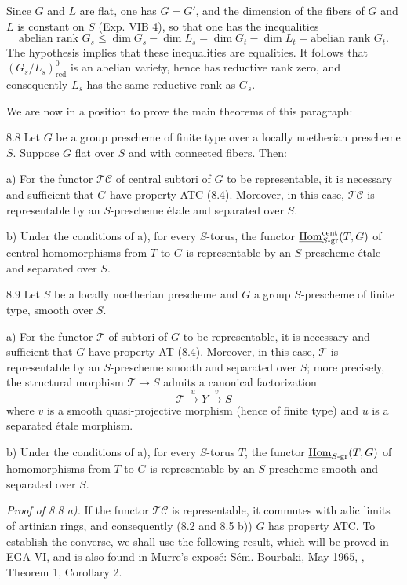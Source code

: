 Since $G$ and $L$ are flat, one has $G=G'$, and the dimension of the fibers of $G$ and $L$ is constant on $S$ (Exp. VIB 4), so that one has the inequalities
\[
\text{abelian rank }G_s\leq\dim G_s-\dim L_s=\dim G_t-\dim L_t=\text{abelian rank }G_t.
\]
The hypothesis implies that these inequalities are equalities. It follows that $(G_s/L_s)^0_{\mathrm{red}}$ is an abelian variety, hence has reductive rank zero, and consequently $L_s$ has the same reductive rank as $G_s$.

We are now in a position to prove the main theorems of this paragraph:
\begin{theorem}{8.8}\label{XV.8.8}
Let $G$ be a group prescheme of finite type over a locally noetherian prescheme $S$. Suppose $G$ flat over $S$ and with connected fibers. Then:

\noindent a) For the functor $\mathscr{TC}$ of central subtori of $G$ to be representable, it is necessary and sufficient that $G$ have property ATC (8.4). Moreover, in this case, $\mathscr{TC}$ is representable by an $S$-prescheme étale and separated over $S$.

\noindent b) Under the conditions of a), for every $S$-torus, the functor $\underline{\operatorname{Hom}}^{\mathrm{cent}}_{S\text{-gr}}(T,G)$ of central homomorphisms from $T$ to $G$ is representable by an $S$-prescheme étale and separated over $S$.
\end{theorem}
\begin{theorem}{8.9}\label{XV.8.9}
Let $S$ be a locally noetherian prescheme and $G$ a group $S$-prescheme of finite type, smooth over $S$.

\noindent a) For the functor $\mathscr T$ of subtori of $G$ to be representable, it is necessary and sufficient that $G$ have property AT (8.4). Moreover, in this case, $\mathscr T$ is representable by an $S$-prescheme smooth and separated over $S$; more precisely, the structural morphism $\mathscr T\to S$ admits a canonical factorization
\[
\mathscr T\xrightarrow{u}Y\xrightarrow{v}S
\]
where $v$ is a smooth quasi-projective morphism (hence of finite type) and $u$ is a separated étale morphism.

\noindent b) Under the conditions of a), for every $S$-torus $T$, the functor $\underline{\operatorname{Hom}}_{S\text{-gr}}(T,G)$ of homomorphisms from $T$ to $G$ is representable by an $S$-prescheme smooth and separated over $S$.
\end{theorem}
\par\noindent\emph{Proof of 8.8 a).}
If the functor $\mathscr{TC}$ is representable, it commutes with adic limits of artinian rings, and consequently (8.2 and 8.5 b)) $G$ has property ATC. To establish the converse, we shall use the following result, which will be proved in EGA VI, and is also found in Murre's exposé: Sém. Bourbaki, May 1965, , Theorem 1, Corollary 2.
